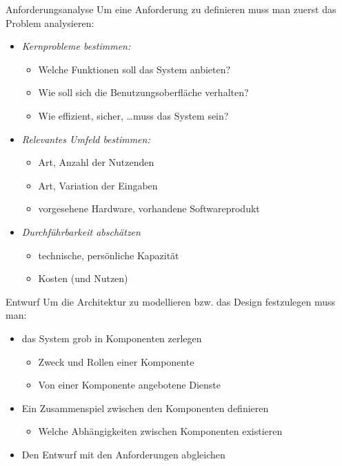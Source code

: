 \begin{bonus}{Anforderungsanalyse}
    Um eine Anforderung zu definieren muss man zuerst das Problem analysieren:
    \begin{itemize}
        \item \emph{Kernprobleme bestimmen:}
              \begin{itemize}
                  \item Welche Funktionen soll das System anbieten?
                  \item Wie soll sich die Benutzungsoberfläche verhalten?
                  \item Wie effizient, sicher, \ldots muss das System sein?
              \end{itemize}
        \item \emph{Relevantes Umfeld bestimmen:}
              \begin{itemize}
                  \item Art, Anzahl der Nutzenden
                  \item Art, Variation der Eingaben
                  \item vorgesehene Hardware, vorhandene Softwareprodukt
              \end{itemize}
        \item \emph{Durchführbarkeit abschätzen}
              \begin{itemize}
                  \item technische, persönliche Kapazität
                  \item Kosten (und Nutzen)
              \end{itemize}
    \end{itemize}
\end{bonus}

\begin{bonus}{Entwurf}
    Um die Architektur zu modellieren bzw. das Design festzulegen muss man:
    \begin{itemize}
        \item das System grob in Komponenten zerlegen
              \begin{itemize}
                  \item Zweck und Rollen einer Komponente
                  \item Von einer Komponente angebotene Dienste
              \end{itemize}
        \item Ein Zusammenspiel zwischen den Komponenten definieren
              \begin{itemize}
                  \item Welche Abhängigkeiten zwischen Komponenten existieren
              \end{itemize}
        \item Den Entwurf mit den Anforderungen abgleichen
    \end{itemize}
\end{bonus}

